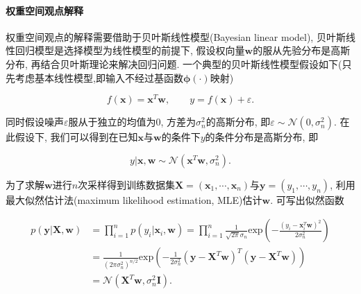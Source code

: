             \paragraph{权重空间观点解释}
                权重空间观点的解释需要借助于贝叶斯线性模型(Bayesian linear model), 贝叶斯线性回归模型是选择模型为线性模型的前提下, 假设权向量$\boldsymbol{w}$的服从先验分布是高斯分布, 再结合贝叶斯理论来解决回归问题. 一个典型的贝叶斯线性模型假设如下(只先考虑基本线性模型,即输入不经过基函数$\boldsymbol{\phi}(\cdot)$映射)

                \begin{equation}
                    f(\boldsymbol{x})=\boldsymbol{x}^{T}\boldsymbol{w},\qquad y=f(\boldsymbol{x})+\varepsilon.
                \end{equation}

                同时假设噪声$\varepsilon$服从于独立的均值为0, 方差为$\sigma^{2}_{n}$的高斯分布, 即$\varepsilon\sim\mathcal{N}(0,\sigma^{2}_{n})$. 在此假设下, 我们可以得到在已知$\boldsymbol{x}$与$\boldsymbol{w}$的条件下$y$的条件分布是高斯分布, 即

                \begin{equation}\label{2.22}
                    y|\boldsymbol{x},\boldsymbol{w}\sim\mathcal{N}(\boldsymbol{x}^{T}\boldsymbol{w}, \sigma^{2}_{n}).
                \end{equation}

                为了求解$\boldsymbol{w}$进行$n$次采样得到训练数据集$\boldsymbol{X}=(\boldsymbol{x}_{1},\cdots,\boldsymbol{x}_{n})$与$\boldsymbol{y}=(y_{1},\cdots,y_{n})$, 利用最大似然估计法(maximum likelihood estimation, MLE)估计$\boldsymbol{w}$. 可写出似然函数

                \begin{equation}\label{2.23}
                    \begin{aligned}
                        p(\boldsymbol{y}|\boldsymbol{X},\boldsymbol{w})
                        &=\prod^{n}_{i=1}p(y_{i}|\boldsymbol{x}_{i},\boldsymbol{w})=\prod^{n}_{i=1}\frac{1}{\sqrt{2\pi}\sigma_{n}}\mathrm{exp}\left(-\frac{(y_{i}-\boldsymbol{x}^{T}_{i}\boldsymbol{w})^{2}}{2\sigma^{2}_{n}}\right) \\
                        &=\frac{1}{(2\pi\sigma^{2}_{n})^{n/2}}\mathrm{exp}\left(-\frac{1}{2\sigma^{2}_{n}}(\boldsymbol{y}-\boldsymbol{X}^{T}\boldsymbol{w})^{T}(\boldsymbol{y}-\boldsymbol{X}^{T}\boldsymbol{w})\right)\\
                        &=\mathcal{N}(\boldsymbol{X}^{T}\boldsymbol{w},\sigma^{2}_{n}\boldsymbol{I}).
                    \end{aligned}
                \end{equation}

